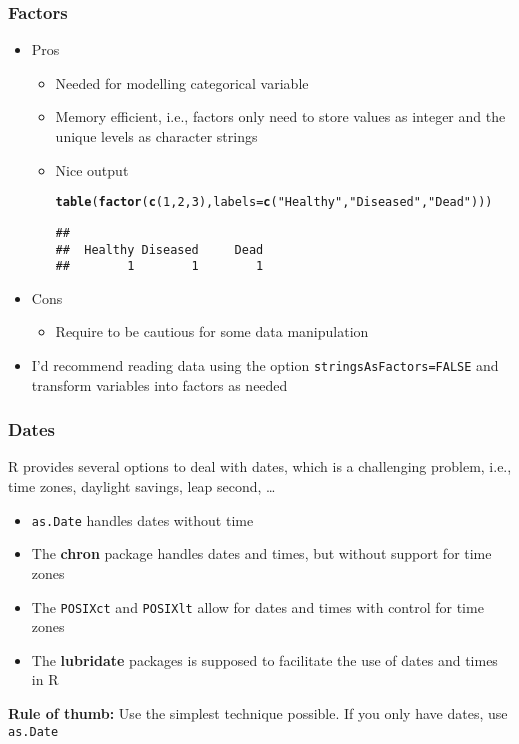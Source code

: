 \documentclass[paper=screen,mathserif]{beamer}\usepackage[]{graphicx}\usepackage[]{color}
\makeatletter
\newcommand{\hlnum}[1]{\textcolor[rgb]{0.686,0.059,0.569}{#1}}%
\newcommand{\hlstr}[1]{\textcolor[rgb]{0.192,0.494,0.8}{#1}}%
\newcommand{\hlstd}[1]{\textcolor[rgb]{0.345,0.345,0.345}{#1}}%
\newcommand{\hlkwc}[1]{\textcolor[rgb]{0.333,0.667,0.333}{#1}}%
\newcommand{\hlkwd}[1]{\textcolor[rgb]{0.737,0.353,0.396}{\textbf{#1}}}%
\newenvironment{kframe}{%
 \def\at@end@of@kframe{}%
 \ifinner\ifhmode%
  \def\at@end@of@kframe{\end{minipage}}%
  \begin{minipage}{\columnwidth}%
 \fi\fi%
 \def\FrameCommand##1{\hskip\@totalleftmargin \hskip-\fboxsep
 \colorbox{shadecolor}{##1}\hskip-\fboxsep
     \hskip-\linewidth \hskip-\@totalleftmargin \hskip\columnwidth}%
 \MakeFramed {\advance\hsize-\width
   \@totalleftmargin\z@ \linewidth\hsize
   \@setminipage}}%
 {\par\unskip\endMakeFramed%
 \at@end@of@kframe}
\newenvironment{knitrout}{}{} %
\newcommand{\ft}[1]{\frametitle{#1}}
\makeatother
\begin{document}
\begin{frame}[fragile]
  \ft{Factors}
  \begin{itemize}
  \item Pros
    \begin{itemize}
    \item Needed for modelling categorical variable
    \item Memory efficient, i.e., factors only need to store values as
      integer and the unique levels as character strings
    \item Nice output
\begin{knitrout}\scriptsize
{}\color{fgcolor}\begin{kframe}
\begin{alltt}
\hlkwd{table}\hlstd{(}\hlkwd{factor}\hlstd{(}\hlkwd{c}\hlstd{(}\hlnum{1}\hlstd{,} \hlnum{2}\hlstd{,} \hlnum{3}\hlstd{),} \hlkwc{labels} \hlstd{=} \hlkwd{c}\hlstd{(}\hlstr{"Healthy"}\hlstd{,} \hlstr{"Diseased"}\hlstd{,} \hlstr{"Dead"}\hlstd{)))}
\end{alltt}
\begin{verbatim}
## 
##  Healthy Diseased     Dead 
##        1        1        1
\end{verbatim}
\end{kframe}
\end{knitrout}
    \end{itemize}
  \item Cons
    \begin{itemize}
    \item Require to be cautious for some data manipulation
    \end{itemize}
  \item I'd recommend reading data using the option
    \verb|stringsAsFactors=FALSE| and transform variables into factors
    as needed
  \end{itemize}
\end{frame}

\begin{frame}[fragile]
  \ft{Dates}
  
  R provides several options to deal with dates, which is a
  challenging problem, i.e., time zones, daylight savings, leap
  second, \dots
  
  \begin{itemize}
  \item \verb=as.Date= handles dates without time
  \item The {\bf chron} package handles dates and times, but without
    support for time zones
  \item The {\tt POSIXct} and {\tt POSIXlt} allow for dates and times
    with control for time zones
  \item The {\bf lubridate} packages is supposed to facilitate the use
    of dates and times in R
  \end{itemize}
  {\bf Rule of thumb:} Use the simplest technique possible. If you
  only have dates, use {\tt as.Date}
  
\end{frame}
\end{document}
